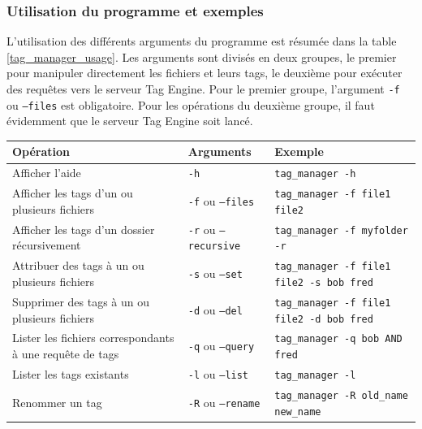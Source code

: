 \subsubsection{Utilisation du programme et exemples}\label{tag_manager_utilisation}
L'utilisation des différents arguments du programme est résumée dans la table \ref{tag_manager_usage}. 
Les arguments sont divisés en deux groupes, le premier pour manipuler directement les fichiers et 
leurs tags, le deuxième pour exécuter des requêtes vers le serveur Tag Engine. Pour le premier groupe, 
l'argument \texttt{-f} ou \texttt{--files} est obligatoire. Pour les opérations 
du deuxième groupe, il faut évidemment que le serveur Tag Engine soit lancé.
\begin{center}
    \begin{tabular}{|p{3.7cm}|p{2.3cm}|p{8.5cm}|} \hline
        \textbf{Opération} & \textbf{Arguments} & \textbf{Exemple} \\ \hline
        Afficher l'aide & \texttt{-h} & \texttt{tag_manager -h} \\ \hline
        Afficher les tags d'un ou plusieurs fichiers & 
            \texttt{-f} ou \texttt{--files} & 
            \texttt{tag_manager -f file1 file2} \\ \hline
        Afficher les tags d'un dossier récursivement & 
            \texttt{-r} ou \texttt{--recursive} & 
            \texttt{tag_manager -f myfolder -r} \\ \hline
        Attribuer des tags à un ou plusieurs fichiers & 
            \texttt{-s} ou \texttt{--set} & 
            \texttt{tag_manager -f file1 file2 -s bob fred} \\ \hline
        Supprimer des tags à un ou plusieurs fichiers & 
            \texttt{-d} ou \texttt{--del} & 
            \texttt{tag_manager -f file1 file2 -d bob fred} \\ \hline
        Lister les fichiers correspondants à une requête de tags & 
            \texttt{-q} ou \texttt{--query} & 
            \texttt{tag_manager -q bob AND fred} \\ \hline
        Lister les tags existants & 
            \texttt{-l} ou \texttt{--list} & 
            \texttt{tag_manager -l} \\ \hline
        Renommer un tag & 
            \texttt{-R} ou \texttt{--rename} & 
            \texttt{tag_manager -R old_name new_name} \\ \hline
    \end{tabular}
    \label{tag_manager_usage}
\end{center}
